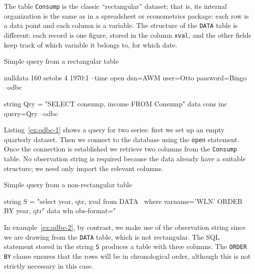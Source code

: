 The table \texttt{Consump} is the classic ``rectangular'' dataset;
that is, its internal organization is the same as in a spreadsheet or
econometrics package: each row is a data point and each column is a
variable. The structure of the \texttt{DATA} table
is different: each record is one figure, stored in the column
\texttt{xval}, and the other fields keep track of which variable it
belongs to, for which date.

\begin{script}[htbp]
  \caption{Simple query from a rectangular table}
  \label{ex:odbc-1}
\begin{scode}
nulldata 160
setobs 4 1970:1 --time
open dsn=AWM user=Otto password=Bingo --odbc

string Qry = "SELECT consump, income FROM Consump"
data cons inc query=Qry --odbc
\end{scode}
\end{script}

Listing~\ref{ex:odbc-1} shows a query for two series: first we set up
an empty quarterly dataset. Then we connect to the database using the
\texttt{open} statement. Once the connection is established we
retrieve two columns from the \texttt{Consump} table. No observation
string is required because the data already have a suitable structure;
we need only import the relevant columns.

\begin{script}[htbp]
  \caption{Simple query from a non-rectangular table}
  \label{ex:odbc-2}
\begin{scode}
string S = "select year, qtr, xval from DATA \
       where varname='WLN' ORDER BY year, qtr"
data wln obs-format="%
\end{scode}
\end{script}

In example~\ref{ex:odbc-2}, by contrast, we make use of the
observation string since we are drawing from the \texttt{DATA}
table, which is not rectangular. The SQL statement stored in the
string \texttt{S} produces a table with three columns. The
\texttt{ORDER BY} clause ensures that the rows will be in
chronological order, although this is not strictly necessary in this
case.

